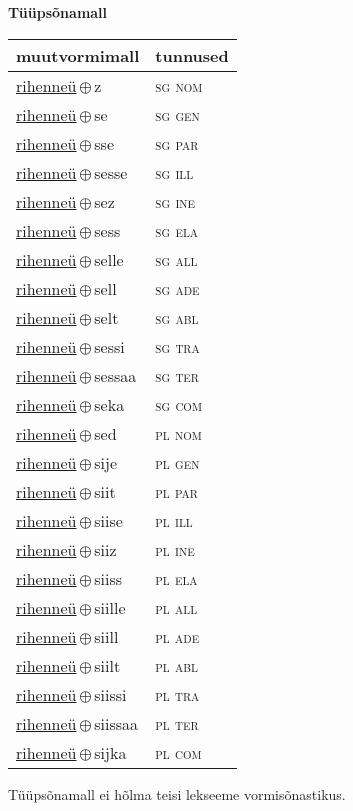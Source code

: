 

\vspace{3.5em}
\noindent \begin{minipage}{\textwidth}
\noindent \textbf{Tüüpsõnamall \,}\\

\begin{sideways}
\begin{tabular}{l l}
muutvormimall & tunnused \\
\hline
\underline{rihenneü}\,$\oplus$\,z & \textsc{ sg nom } \\
\underline{rihenneü}\,$\oplus$\,se & \textsc{ sg gen } \\
\underline{rihenneü}\,$\oplus$\,sse & \textsc{ sg par } \\
\underline{rihenneü}\,$\oplus$\,sesse & \textsc{ sg ill } \\
\underline{rihenneü}\,$\oplus$\,sez & \textsc{ sg ine } \\
\underline{rihenneü}\,$\oplus$\,sess & \textsc{ sg ela } \\
\underline{rihenneü}\,$\oplus$\,selle & \textsc{ sg all } \\
\underline{rihenneü}\,$\oplus$\,sell & \textsc{ sg ade } \\
\underline{rihenneü}\,$\oplus$\,selt & \textsc{ sg abl } \\
\underline{rihenneü}\,$\oplus$\,sessi & \textsc{ sg tra } \\
\underline{rihenneü}\,$\oplus$\,sessaa & \textsc{ sg ter } \\
\underline{rihenneü}\,$\oplus$\,seka & \textsc{ sg com } \\
\underline{rihenneü}\,$\oplus$\,sed & \textsc{ pl nom } \\
\underline{rihenneü}\,$\oplus$\,sije & \textsc{ pl gen } \\
\underline{rihenneü}\,$\oplus$\,siit & \textsc{ pl par } \\
\underline{rihenneü}\,$\oplus$\,siise & \textsc{ pl ill } \\
\underline{rihenneü}\,$\oplus$\,siiz & \textsc{ pl ine } \\
\underline{rihenneü}\,$\oplus$\,siiss & \textsc{ pl ela } \\
\underline{rihenneü}\,$\oplus$\,siille & \textsc{ pl all } \\
\underline{rihenneü}\,$\oplus$\,siill & \textsc{ pl ade } \\
\underline{rihenneü}\,$\oplus$\,siilt & \textsc{ pl abl } \\
\underline{rihenneü}\,$\oplus$\,siissi & \textsc{ pl tra } \\
\underline{rihenneü}\,$\oplus$\,siissaa & \textsc{ pl ter } \\
\underline{rihenneü}\,$\oplus$\,sijka & \textsc{ pl com } \\
\end{tabular}
\end{sideways}
\label{tab:tüüpsõnamall-rihenneüz}

\end{minipage}

 
\vspace{1em}
\noindent Tüüpsõnamall  ei hõlma teisi lekseeme vormi\-sõnastikus.
